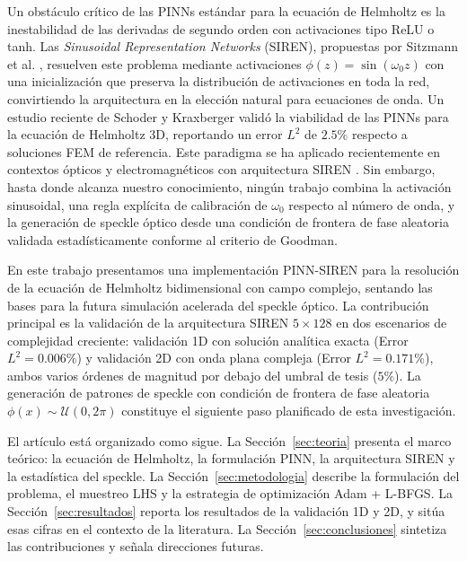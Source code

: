Un obstáculo crítico de las PINNs estándar para la ecuación de Helmholtz es la inestabilidad
de las derivadas de segundo orden con activaciones tipo ReLU o tanh.
Las \textit{Sinusoidal Representation Networks} (SIREN), propuestas por
Sitzmann et al. \cite{Sitzmann2020_SIREN}, resuelven este problema mediante activaciones
$\phi(z) = \sin(\omega_0 z)$ con una inicialización que preserva la distribución de
activaciones en toda la red, convirtiendo la arquitectura en la elección natural para
ecuaciones de onda.
Un estudio reciente de Schoder y Kraxberger \cite{Schoder2024_PINN_acoustics} validó la
viabilidad de las PINNs para la ecuación de Helmholtz 3D, reportando un error $L^2$ de
$2.5\%$ respecto a soluciones FEM de referencia.
Este paradigma se ha aplicado recientemente en contextos ópticos y electromagnéticos con
arquitectura SIREN \cite{Panagiotakopoulos2026_Helmholtz}. Sin embargo, hasta donde alcanza
nuestro conocimiento, ningún trabajo combina la activación sinusoidal, una regla explícita de
calibración de $\omega_0$ respecto al número de onda, y la generación de speckle óptico desde
una condición de frontera de fase aleatoria validada estadísticamente conforme al criterio de
Goodman.

En este trabajo presentamos una implementación PINN-SIREN para la resolución de la ecuación
de Helmholtz bidimensional con campo complejo, sentando las bases para la futura simulación
acelerada del speckle óptico.
La contribución principal es la validación de la arquitectura SIREN $5\times128$ en dos
escenarios de complejidad creciente: validación 1D con solución analítica exacta
(Error $L^2 = 0.006\%$) y validación 2D con onda plana compleja (Error $L^2 = 0.171\%$),
ambos varios órdenes de magnitud por debajo del umbral de tesis ($5\%$).
La generación de patrones de speckle con condición de frontera de fase aleatoria
$\phi(x) \sim \mathcal{U}(0, 2\pi)$ constituye el siguiente paso planificado de esta investigación.

El artículo está organizado como sigue.
La Sección~\ref{sec:teoria} presenta el marco teórico: la ecuación de Helmholtz, la formulación
PINN, la arquitectura SIREN y la estadística del speckle.
La Sección~\ref{sec:metodologia} describe la formulación del problema, el muestreo LHS y la
estrategia de optimización Adam + L-BFGS.
La Sección~\ref{sec:resultados} reporta los resultados de la validación 1D y 2D, y
sitúa esas cifras en el contexto de la literatura.
La Sección~\ref{sec:conclusiones} sintetiza las contribuciones y señala direcciones futuras.
